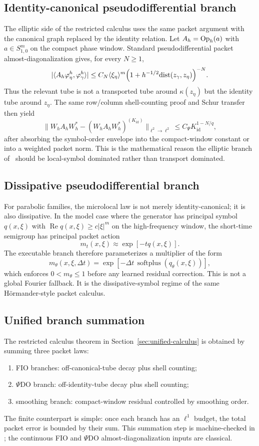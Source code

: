 \subsection{Identity-canonical pseudodifferential branch}

The elliptic side of the restricted calculus uses the same packet argument with the canonical graph replaced by the identity relation.  Let $A_h=\operatorname{Op}_h(a)$ with $a\in S^m_{1,0}$ on the compact phase window.  Standard pseudodifferential packet almost-diagonalization gives, for every $N\ge 1$,
\[
|\langle A_h\varphi_\eta^h,\varphi_\gamma^h\rangle|
\le
C_N \langle \xi_\eta\rangle^m
\Bigl(1+h^{-1/2}\mathrm{dist}(z_\gamma,z_\eta)\Bigr)^{-N}.
\]
Thus the relevant tube is not a transported tube around $\kappa(z_\eta)$ but the identity tube around $z_\eta$.  The same row/column shell-counting proof and Schur transfer then yield
\[
\|W_hA_hW_h^\ast-(W_hA_hW_h^\ast)^{(K_{\mathrm{id}})}\|_{\ell^2\to\ell^2}
\le
C_{\Psi}K_{\mathrm{id}}^{1-N/q},
\]
after absorbing the symbol-order envelope into the compact-window constant or into a weighted packet norm.  This is the mathematical reason the elliptic branch of \MiNO\ should be local-symbol dominated rather than transport dominated.

\subsection{Dissipative pseudodifferential branch}

For parabolic families, the microlocal law is not merely identity-canonical; it is also dissipative.  In the model case where the generator has principal symbol $q(x,\xi)$ with $\operatorname{Re}q(x,\xi)\ge c|\xi|^m$ on the high-frequency window, the short-time semigroup has principal packet action
\[
m_t(x,\xi)\approx \exp[-tq(x,\xi)].
\]
The executable branch therefore parameterizes a multiplier of the form
\[
m_\theta(x,\xi,\Delta t)
=
\exp[-\Delta t\,\operatorname{softplus}(q_\theta(x,\xi))],
\]
which enforces $0<m_\theta\le 1$ before any learned residual correction.  This is not a global Fourier fallback.  It is the dissipative-symbol regime of the same H\"ormander-style packet calculus.

\subsection{Unified branch summation}

The restricted calculus theorem in Section~\ref{sec:unified-calculus} is obtained by summing three packet laws:
\begin{enumerate}
\item FIO branches: off-canonical-tube decay plus shell counting;
\item $\Psi$DO branch: off-identity-tube decay plus shell counting;
\item smoothing branch: compact-window residual controlled by smoothing order.
\end{enumerate}
The finite counterpart is simple: once each branch has an $\ell^1$ budget, the total packet error is bounded by their sum. This summation step is machine-checked in ; the continuous FIO and $\Psi$DO almost-diagonalization inputs are classical.

